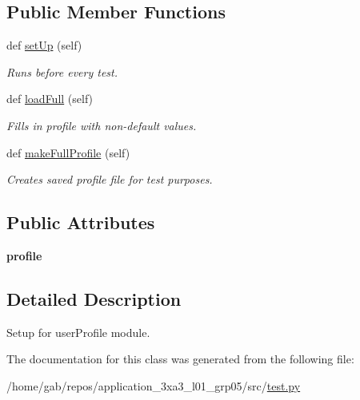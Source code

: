 \subsection*{Public Member Functions}
\begin{DoxyCompactItemize}
\item 
\mbox{\label{classtest_1_1userProfileBase_ab1675872398acef5e0fede36dd3db672}} 
def \hyperlink{classtest_1_1userProfileBase_ab1675872398acef5e0fede36dd3db672}{set\+Up} (self)
\begin{DoxyCompactList}\small\item\em Runs before every test. \end{DoxyCompactList}\item 
\mbox{\label{classtest_1_1userProfileBase_af6036c1beb54b38dd9d9fb1293aeb3b3}} 
def \hyperlink{classtest_1_1userProfileBase_af6036c1beb54b38dd9d9fb1293aeb3b3}{load\+Full} (self)
\begin{DoxyCompactList}\small\item\em Fills in profile with non-\/default values. \end{DoxyCompactList}\item 
\mbox{\label{classtest_1_1userProfileBase_ac395fc9b444a49856d520874a3b4e90b}} 
def \hyperlink{classtest_1_1userProfileBase_ac395fc9b444a49856d520874a3b4e90b}{make\+Full\+Profile} (self)
\begin{DoxyCompactList}\small\item\em Creates saved profile file for test purposes. \end{DoxyCompactList}\end{DoxyCompactItemize}
\subsection*{Public Attributes}
\begin{DoxyCompactItemize}
\item 
\mbox{\label{classtest_1_1userProfileBase_aa2e266103d1680856e874535c72c5988}} 
{\bfseries profile}
\end{DoxyCompactItemize}


\subsection{Detailed Description}
Setup for user\+Profile module. 

The documentation for this class was generated from the following file\+:\begin{DoxyCompactItemize}
\item 
/home/gab/repos/application\+\_\+3xa3\+\_\+l01\+\_\+grp05/src/\hyperlink{test_8py}{test.\+py}\end{DoxyCompactItemize}
